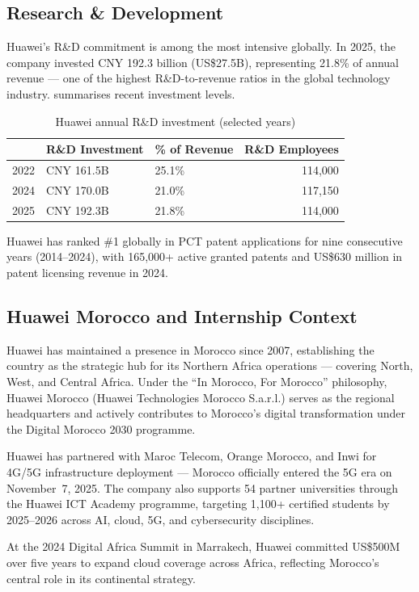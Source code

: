 \subsection{Research \& Development}
\label{subsec:huawei-rd}

Huawei's R\&D commitment is among the most intensive globally. In 2025, the
company invested CNY 192.3 billion (US\$27.5B), representing 21.8\% of annual
revenue — one of the highest R\&D-to-revenue ratios in the global technology
industry.  summarises recent investment levels.

\begin{table}[htbp]
  \centering
  \caption{Huawei annual R\&D investment (selected years)}
  \label{tab:rd-investment}
  \begin{tabularx}{0.88\textwidth}{lllr}
    \toprule
    \tableheader{Year & R\&D Investment & \% of Revenue & R\&D Employees} \\
    \midrule
    2022 & CNY 161.5B  & 25.1\% & 114,000 \\
    \rowcolor{TableRowOdd}
    2024 & CNY 170.0B  & 21.0\% & 117,150 \\
    2025 & CNY 192.3B  & 21.8\% & 114,000 \\
    \bottomrule
  \end{tabularx}
\end{table}

Huawei has ranked \#1 globally in PCT patent applications for nine consecutive
years (2014–2024), with 165,000+ active granted patents and US\$630 million in
patent licensing revenue in 2024.

\subsection{Huawei Morocco and Internship Context}
\label{subsec:huawei-morocco}

Huawei has maintained a presence in Morocco since 2007, establishing the
country as the strategic hub for its Northern Africa operations — covering
North, West, and Central Africa. Under the ``In Morocco, For Morocco''
philosophy, Huawei Morocco (Huawei Technologies Morocco S.a.r.l.) serves
as the regional headquarters and actively contributes to Morocco's digital
transformation under the Digital Morocco 2030 programme.


Huawei has partnered with Maroc Telecom, Orange Morocco, and Inwi for 4G/5G
infrastructure deployment — Morocco officially entered the 5G era on
November~7, 2025. The company also supports 54 partner universities through
the Huawei ICT Academy programme, targeting 1,100+ certified students by
2025–2026 across AI, cloud, 5G, and cybersecurity disciplines.

At the 2024 Digital Africa Summit in Marrakech, Huawei committed US\$500M over
five years to expand cloud coverage across Africa, reflecting Morocco's central
role in its continental strategy.

